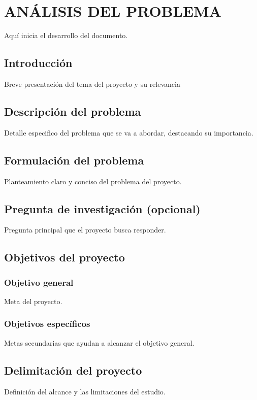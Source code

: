\documentclass[12pt,letterpaper]{report}
\begin{document}
	\caratulaTapa
	\caratulaContenido
	
	\configurarIndices
    \tableofcontents
    \thispagestyle{empty}
    \newpage
    \listoffigures
    \thispagestyle{empty}
    \newpage
    \listoftables
    \thispagestyle{empty}
    \newpage
	
	
	\iniciarNumeracion
	\renewcommand{\thesection}{\arabic{section}}
	\section{ANÁLISIS DEL PROBLEMA}
	Aquí inicia el desarrollo del documento.
	\subsection{Introducción}
	Breve presentación del tema del proyecto y su relevancia
	\subsection{Descripción del problema}
	Detalle especifico del problema que se va a abordar, destacando su importancia.
	\subsection{Formulación del problema}
	Planteamiento claro y conciso del problema del proyecto.
	\subsection{Pregunta de investigación (opcional)}
	Pregunta principal que el proyecto busca responder.
	\subsection{Objetivos del proyecto}
	\subsubsection{Objetivo general}
	Meta  del proyecto.
	\subsubsection{Objetivos específicos}
	Metas secundarias que ayudan a alcanzar el objetivo general.
	\subsection{Delimitación del proyecto}
	Definición del alcance y las limitaciones del estudio.
\end{document}
